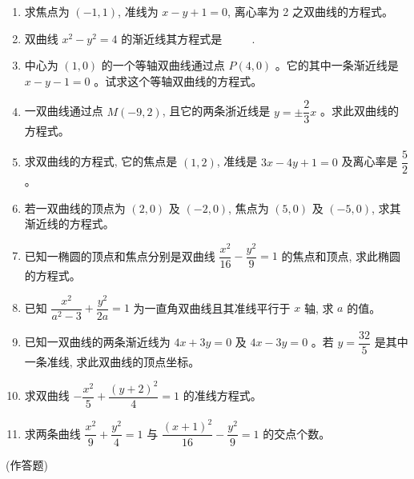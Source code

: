 \documentclass[10pt]{article}
\begin{document}
\begin{enumerate}
  \item 求焦点为 $(-1,1)$, 准线为 $x-y+1=0$, 离心率为 2 之双曲线的方程式。
  \item 双曲线 $x^{2}-y^{2}=4$ 的渐近线其方程式是 $\qquad$ .
  \item 中心为 $(1,0)$ 的一个等轴双曲线通过点 $P(4,0)$ 。它的其中一条渐近线是 $x-y-1=0$ 。试求这个等轴双曲线的方程式。
  \item 一双曲线通过点 $M(-9,2)$, 且它的两条浙近线是 $y= \pm \dfrac{2}{3} x$ 。求此双曲线的方程式。
  \item 求双曲线的方程式, 它的焦点是 $(1,2)$, 准线是 $3 x-4 y+1=0$ 及离心率是 $\dfrac{5}{2}$ 。
  \item 若一双曲线的顶点为 $(2,0)$ 及 $(-2,0)$, 焦点为 $(5,0)$ 及 $(-5,0)$, 求其渐近线的方程式。
  \item 已知一椭圆的顶点和焦点分别是双曲线 $\dfrac{x^{2}}{16}-\dfrac{y^{2}}{9}=1$ 的焦点和顶点, 求此椭圆的方程式。
  \item 已知 $\dfrac{x^{2}}{a^{2}-3}+\dfrac{y^{2}}{2 a}=1$ 为一直角双曲线且其准线平行于 $x$ 轴, 求 $a$ 的值。
  \item 已知一双曲线的两条渐近线为 $4 x+3 y=0$ 及 $4 x-3 y=0$ 。若 $y=\dfrac{32}{5}$ 是其中一条准线, 求此双曲线的顶点坐标。
  \item 求双曲线 $-\dfrac{x^{2}}{5}+\dfrac{(y+2)^{2}}{4}=1$ 的准线方程式。
  \item 求两条曲线 $\dfrac{x^{2}}{9}+\dfrac{y^{2}}{4}=1$ 与 $\dfrac{(x+1)^{2}}{16}-\dfrac{y^{2}}{9}=1$ 的交点个数。
\end{enumerate}

(作答题)
\end{document}
